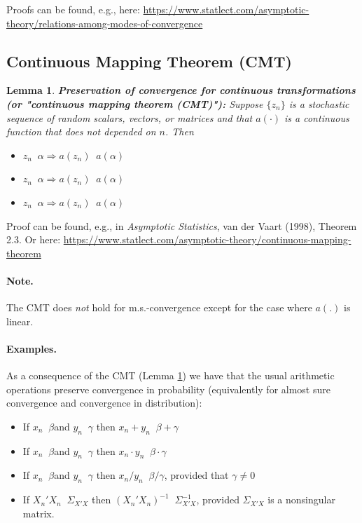 \documentclass[
  14pt,
]{memoir}
\DeclareMathOperator{\toprob}{\overset{p}{\longrightarrow}}
\DeclareMathOperator{\toas}{\overset{a.s.}{\longrightarrow}}
\DeclareMathOperator{\todistr}{\overset{d}{\longrightarrow}}
\newtheorem{lemma}[theorem]{Lemma}
\begin{document}
\noindent Proofs can be found, e.g., here: \url{https://www.statlect.com/asymptotic-theory/relations-among-modes-of-convergence}

\hypertarget{continuous-mapping-theorem-cmt}{%
\subsection{Continuous Mapping Theorem (CMT)}\label{continuous-mapping-theorem-cmt}}

\begin{lemma}\label{Preserv}\textbf{Preservation of convergence for continuous transformations (or "continuous mapping theorem (CMT)"):} Suppose $\{z_n\}$ is a stochastic sequence of random scalars, vectors, or matrices and that $a(\cdot)$ is a continuous function that does not depended on $n$. Then
\begin{itemize}
\item[(i)] $z_n\toprob\alpha\Rightarrow a(z_n)\toprob a(\alpha)$
\item[(ii)]$z_n\toas  \alpha\Rightarrow a(z_n)\toas a(\alpha)$
\item[(iii)]$z_n\todistr\alpha\Rightarrow a(z_n)\todistr a(\alpha)$
\end{itemize}
\end{lemma}

\noindent Proof can be found, e.g., in \emph{Asymptotic Statistics}, van der Vaart (1998), Theorem 2.3. Or here: \url{https://www.statlect.com/asymptotic-theory/continuous-mapping-theorem}

\paragraph*{Note.}

The CMT does \emph{not} hold for m.s.-convergence except for the case where \(a(.)\) is linear.\\

\paragraph*{Examples.}

As a consequence of the CMT (Lemma \ref{Preserv}) we have that the usual arithmetic operations preserve convergence in probability (equivalently for almost sure convergence and convergence in distribution):

\begin{itemize}
\item[] If $x_n\toprob \beta$\quad and \quad $y_n\toprob \gamma$ \quad then\;\; $x_n+y_n\toprob \beta+\gamma$
\item[] If $x_n\toprob \beta$\quad and \quad $y_n\toprob \gamma$ \quad then\;\; $x_n\cdot y_n\toprob \beta\cdot\gamma$
\item[] If $x_n\toprob \beta$\quad and \quad $y_n\toprob \gamma$ \quad then\; $x_n/y_n\toprob \beta/\gamma$, \quad provided that $\gamma\neq 0$
\item[] If $X_n'X_n\toprob \Sigma_{X'X}$ \quad then\; $(X_n'X_n)^{-1}\toprob \Sigma_{X'X}^{-1}$, provided $\Sigma_{X'X}$ is a nonsingular matrix.
\end{itemize}
\end{document}
